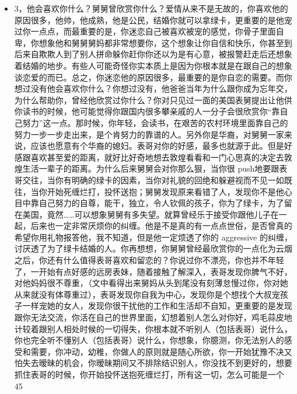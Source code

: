 \documentclass[9pt, b5paper]{article}
\begin{document}
\begin{enumerate}
\begin{enumerate}
\begin{itemize}
\item 3，他会喜欢你什么？舅舅曾欣赏你什么？爱情从来不是无故的，你喜欢他的原因很多，他帅，他成熟，他是公民，结婚你就可以拿绿卡，更重要的是他宠过你一点点，而最重要的是，你迷恋自己被喜欢被宠的感觉，你骨子里面自卑，你想象他和舅舅舅妈都非常想要你，这个想象让你自信和快乐，你甚至到后来自欺欺人到了别人拼命躲你赶你你还以为是有心意，被报警赶走后还想象着结婚的地步。有些人可能奇怪你实本质上是因为你根本就是在跟自己的想象谈恋爱的而已。总之，你迷恋他的原因很多，最重要的是你自恋的需要。而你想过没有他会喜欢你什么？你想过没有，他爸爸当年为什么跟你成为忘年交，为什么帮助你，曾经他欣赏过你什么？你对只见过一面的美国表舅提出让他供你读书的时候，他可能觉得你跟国内很多攀亲戚的人一分子会很欣赏你“靠自己努力”这一点。那时候，你年轻，会读书，在艰苦的农村环境里面靠自己的努力一步一步走出来，是个肯努力的靠谱的人。另外你是华裔，对舅舅一家来说，应该也愿意有个华裔的媳妇。表哥对你的好感，最多也就源于此。但是好感跟喜欢甚至爱的距离，就好比好奇地想去敦煌看看和一门心思真的决定去敦煌生活一辈子的距离。为什么后来舅舅会对你那么狠，当你很 push地要跟表哥交往，当你有明确的绿卡的因素，当你对礼貌的回绝和躲避视而不见一如既往，当你开始死缠烂打，投怀送抱；舅舅发现原来看错了人，发现你不是他心目中靠自己努力的自尊，能干，独立，令人钦佩的孩子，你为了绿卡，为了留在美国，竟然……可以想象舅舅有多失望。就算曾经乐于接受你跟他儿子在一起，后来也一定非常厌烦你的纠缠。他是不是真的有一点点世俗，是否曾真的希望你用礼物报答他，我不知道，但是他一定烦透了你的 aggressive 的纠缠，讨厌透了为了绿卡结婚的人。你再想想，你舅舅曾经最欣赏你的一点化为云烟之后，你还有什么值得表哥喜欢和留恋的？你说过你不漂亮，你也并不年轻了，一开始有点好感的远房表妹，随着接触了解深入，表哥发现你脾气不好，对他妈妈很不尊重，（文中看得出来舅妈从头到尾没有刻薄怠慢过你，你对她从来就没有体尊重过），表哥发现你自我为中心，发现你是个想找个大叔宠孩子一样宠她的女人，发现你很干扰他的工作和生活却不自知，更重要的是发现跟你无法交流，你活在自己的世界里面，幻想着别人怎么对你好，鸡毛蒜皮地计较着跟别人相处时候的一切得失，你根本就不听别人（包括表哥）说什么，你也完全听不懂别人（包括表哥）说什么，你想象，你臆测，你无法别人的感受和需要，你冲动，幼稚，你做人的原则就是随心所欲，你一开始犹豫不决又怕失去暧昧的机会，你暧昧期间又不排除结识别人，你没找不到更好的，想要抓住表哥的时候，你开始投怀送抱死缠烂打，所有这一切，怎么可能是一个 45 
\end{itemize}
\end{enumerate}
\end{enumerate}
\end{document}
